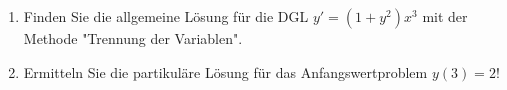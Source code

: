 \item 
\begin{enumerate}
\item Finden Sie die allgemeine Lösung für die DGL $ y'=(1+y^2)x^3$ mit der Methode "Trennung der Variablen".
\item Ermitteln Sie die partikuläre Lösung für das Anfangswertproblem $y(3)=2$!
\end{enumerate}

